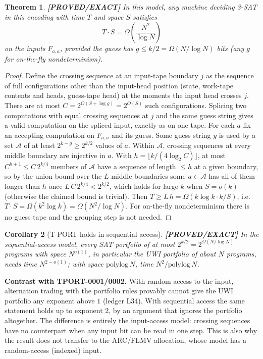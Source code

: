 \documentclass[11pt]{article}
\newtheorem{theorem}{Theorem}
\newtheorem{corollary}[theorem]{Corollary}
\theoremstyle{remark}
\newcommand{\status}[1]{\textbf{[#1]}}
\begin{document}
\begin{theorem}\label{thm:seq} \status{PROVED/EXACT}
In this model, any machine deciding 3-SAT in this encoding with time $T$ and space $S$ satisfies
\[
T\cdot S=\Omega\!\left(\frac{N^2}{\log N}\right)
\]
on the inputs $F_{a,a}$, provided the guess has $g\le k/2=\Omega(N/\log N)$ bits (any $g$ for on-the-fly
nondeterminism).
\end{theorem}
\begin{proof}
Define the crossing sequence at an input-tape boundary $j$ as the sequence of full configurations other
than the input-head position (state, work-tape contents and heads, guess-tape head) at the moments the
input head crosses $j$. There are at most $C=2^{O(S+\log g)}=2^{O(S)}$ such configurations. Splicing two
computations with equal crossing sequences at $j$ and the same guess string gives a valid computation on
the spliced input, exactly as on one tape.
For each $a$ fix an accepting computation on $F_{a,a}$ and its guess. Some guess string $y$ is used by a set
$\mathcal A$ of at least $2^{k-g}\ge2^{k/2}$ values of $a$. Within $\mathcal A$, crossing sequences at every
middle boundary are injective in $a$. With $h=\lfloor k/(4\log_2C)\rfloor$, at most $C^{h+1}\le C\,2^{k/4}$
members of $\mathcal A$ have a sequence of length $\le h$ at a given boundary, so by the union bound over the
$L$ middle boundaries some $a\in\mathcal A$ has all of them longer than $h$ once $L\,C\,2^{k/4}<2^{k/2}$,
which holds for large $k$ when $S=o(k)$ (otherwise the claimed bound is trivial). Then
$T\ge L\,h=\Omega(k\log k\cdot k/S)$, i.e.\ $T\cdot S=\Omega(k^2\log k)=\Omega(N^2/\log N)$.
For on-the-fly nondeterminism there is no guess tape and the grouping step is not needed.
\end{proof}

\begin{corollary}[T-PORT holds in sequential access] \status{PROVED/EXACT}
In the sequential-access model, every SAT portfolio of at most $2^{k/2}=2^{\Omega(N/\log N)}$ programs with
space $N^{o(1)}$, in particular the UWI portfolio of about $N$ programs, needs time $N^{2-o(1)}$; with space
$\mathrm{polylog}\,N$, time $N^2/\mathrm{polylog}\,N$.
\end{corollary}

\noindent\textbf{Contrast with TPORT-0001/0002.} With random access to the input, alternation trading with
the portfolio rules provably cannot give the UWI portfolio any exponent above $1$ (ledger L34). With
sequential access the same statement holds up to exponent $2$, by an argument that ignores the portfolio
altogether. The difference is entirely the input-access model: crossing sequences have no counterpart when
any input bit can be read in one step. This is also why the result does not transfer to the ARC/FLMV
allocation, whose model has a random-access (indexed) input.
\end{document}
